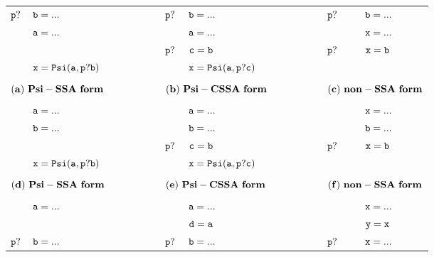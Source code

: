 \begin{figure*}
\begin{center}
\footnotesize
\begin{tabular}{llllllll}
${\tt p?}$  & ${\tt b = ...}$ & \ \ \ \ \ \ \ \  & ${\tt p?}$ & ${\tt b = ...}$ & \ \ \ \ \ \ \ \  & ${\tt p?}$ & ${\tt b = ...}$ \\
            & ${\tt a = ...}$ & \ \ \ \ \ \ \ \  &            & ${\tt a = ...}$ & \ \ \ \ \ \ \ \  &            & ${\tt x = ...}$ \\
            &                 & \ \ \ \ \ \ \ \  & ${\tt p?}$ & ${\tt c = b}$   & \ \ \ \ \ \ \ \  & ${\tt p?}$ & ${\tt x = b}$ \\
            & ${\tt x = Psi(a,p?b)}$ & \ \ \ \ \ \ \ \  &     & ${\tt x = Psi(a,p?c)}$  & \ \ \ \ \ \ \ \ &     & \\
\\
\multicolumn{2}{l}{${\tt {\bf (a)\ Psi-SSA\ form}}$} & \ \ \ \ \ \ \ \  &\multicolumn{2}{l}{${\tt {\bf (b)\ Psi-CSSA\ form}}$} & \ \ \ \ \ \ \ \  &\multicolumn{2}{l}{${\tt {\bf (c)\ non-SSA\ form}}$} \\
\\
            & ${\tt a = ...}$ & \ \ \ \ \ \ \ \  &            & ${\tt a = ...}$ & \ \ \ \ \ \ \ \  &            & ${\tt x = ...}$ \\
            & ${\tt b = ...}$ & \ \ \ \ \ \ \ \  &            & ${\tt b = ...}$ & \ \ \ \ \ \ \ \  &            & ${\tt b = ...}$ \\
            &                 & \ \ \ \ \ \ \ \  & ${\tt p?}$ & ${\tt c = b}$   & \ \ \ \ \ \ \ \  & ${\tt p?}$ & ${\tt x = b}$ \\
            & ${\tt x = Psi(a,p?b)}$ & \ \ \ \ \ \ \ \  &     & ${\tt x = Psi(a,p?c)}$  & \ \ \ \ \ \ \ \ &     & \\
\\
\multicolumn{2}{l}{${\tt {\bf (d)\ Psi-SSA\ form}}$} & \ \ \ \ \ \ \ \  &\multicolumn{2}{l}{${\tt {\bf (e)\ Psi-CSSA\ form}}$} & \ \ \ \ \ \ \ \  &\multicolumn{2}{l}{${\tt {\bf (f)\ non-SSA\ form}}$} \\
\\
            & ${\tt a = ...}$ & \ \ \ \ \ \ \ \  &            & ${\tt a = ...}$ & \ \ \ \ \ \ \ \  &            & ${\tt x = ...}$ \\
            &                 & \ \ \ \ \ \ \ \  &            & ${\tt d = a}$ & \ \ \ \ \ \ \ \  &            & ${\tt y = x}$ \\
${\tt p?}$  & ${\tt b = ...}$ & \ \ \ \ \ \ \ \  & ${\tt p?}$ & ${\tt b = ...}$ & \ \ \ \ \ \ \ \  & ${\tt p?}$ & ${\tt x = ...}$ \\

\end{tabular}
\end{center}
\end{figure*}
